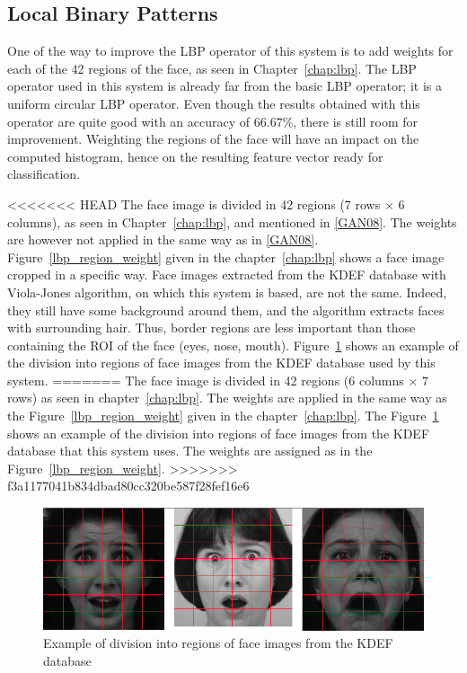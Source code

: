 \subsection{Local Binary Patterns}

\vspace{\baselineskip}
\noindent One of the way to improve the LBP operator of this system is to add weights for each of the 42 regions of the face, as seen in Chapter~\ref{chap:lbp}. The LBP operator used in this system is already far from the basic LBP operator; it is a uniform circular LBP operator. Even though the results obtained with this operator are quite good with an accuracy of $ 66.67\% $, there is still room for improvement. Weighting the regions of the face will have an impact on the computed histogram, hence on the resulting feature vector ready for classification. \newline

<<<<<<< HEAD
\noindent The face image is divided in 42 regions ($ 7 $ rows $\times$ $ 6 $ columns), as seen in Chapter~\ref{chap:lbp}, and mentioned in \ref{GAN08}. The weights are however not applied in the same way as in \ref{GAN08}. Figure~\ref{lbp_region_weight} given in the chapter~\ref{chap:lbp} shows a face image cropped in a specific way. Face images extracted from the KDEF database with Viola-Jones algorithm, on which this system is based, are not the same. Indeed, they still have some background around them, and the algorithm extracts faces with surrounding hair. Thus, border regions are less important than those containing the ROI of the face (eyes, nose, mouth). Figure~\ref{implementation_weight_example} shows an example of the division into regions of face images from the KDEF database used by this system.
=======
\noindent The face image is divided in 42 regions ($ 6 $ columns $ \times $ $ 7 $ rows) as seen in chapter~\ref{chap:lbp}. The weights are applied in the same way as the Figure~\ref{lbp_region_weight} given in the chapter~\ref{chap:lbp}. The Figure~\ref{implementation_weight_example} shows an example of the division into regions of face images from the KDEF database that this system uses. The weights are assigned as in the Figure~\ref{lbp_region_weight}.
>>>>>>> f3a1177041b834dbad80cc320be587f28fef16e6
\newline

\begin{figure}[!h]
\begin{center}
\noindent \includegraphics[scale=0.3]{figures/implementation_weight_example} 
\newline
\caption{Example of division into regions of face images from the KDEF database}
\label{implementation_weight_example}
\end{center} 
\end{figure}

